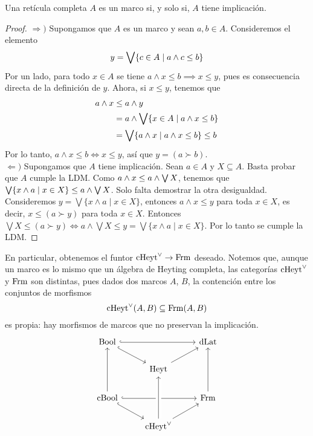 \begin{theorem}
  Una retícula completa $A$ es un marco si, y solo si, $A$ tiene
  implicación.
\end{theorem}
\begin{proof}
    $\Rightarrow )$ Supongamos que $A$ es un marco y sean $a,b\in A$.
    Consideremos el elemento
    $$y=\bigvee\{c\in A\mid a\wedge c\leq b\}$$
    Por un lado, para todo $x\in A$ se tiene
    $a\wedge x\leq b\implies x\leq y$,
    pues es consecuencia directa de la definición de $y$.
    Ahora, si $x\leq y$, tenemos que 
    \begin{align*}
        a\wedge x
        & \leq a\wedge y \\
        & = a\wedge\bigvee\{x\in A\mid a\wedge x\leq b\}\\
        & = \bigvee \{a\wedge x \mid a\wedge x\leq b\}\leq b
    \end{align*}
    Por lo tanto, $a\wedge x\leq b\Leftrightarrow x\leq y$,
    así que $y=(a\succ b)$. \\
    $\Leftarrow )$ Supongamos que $A$ tiene implicación.
    Sean $a\in A$ y $X\subseteq A$.
    Basta probar que $A$ cumple la LDM.
    Como $a\wedge x\leq a\wedge\bigvee X$, tenemos que
    $\bigvee\{x\wedge a\mid x\in X\}\leq a\wedge\bigvee X$.
    Solo falta demostrar la otra desigualdad. Consideremos $y=\bigvee\{x\wedge a\mid x\in X\}$, entonces $a\wedge x\leq y$ para toda $x\in X$, es decir, $x\leq (a\succ y)$ para toda $x\in X$. Entonces $\bigvee X\leq (a\succ y)\Leftrightarrow a\wedge\bigvee X\leq y=\bigvee \{x\wedge a\mid x\in X\}$. Por lo tanto se cumple la LDM.
\end{proof}

En particular, obtenemos el funtor $\mathrm{cHeyt}^\vee\to\mathrm{Frm}$ deseado.
Notemos que, aunque un marco es lo mismo que un álgebra de Heyting
completa, las categorías $\mathrm{cHeyt}^\vee$ y $\mathrm{Frm}$ son distintas, pues dados
dos marcos $A$, $B$, la contención entre los conjuntos de morfismos
\begin{equation}
  \mathrm{cHeyt}^\vee(A,B) \subseteq \mathrm{Frm}(A,B)
\end{equation}
es propia: hay morfismos de marcos que no preservan la implicación.
\begin{equation}\label{diag:prisma-cheyt-completo}
\begin{tikzcd}
  \Bool \ar[dr,hook] \ar[rr,hook] &               & \DLat \\
                                  & \Heyt \ar[ur]         \\
  \CBA \ar[uu] \ar[rr,hook] \ar[dr,hook] & & \Frm \ar[uu]    \\
                            & \cHeyt \ar[uu,crossing over] \ar[ur]
\end{tikzcd}
\end{equation}


